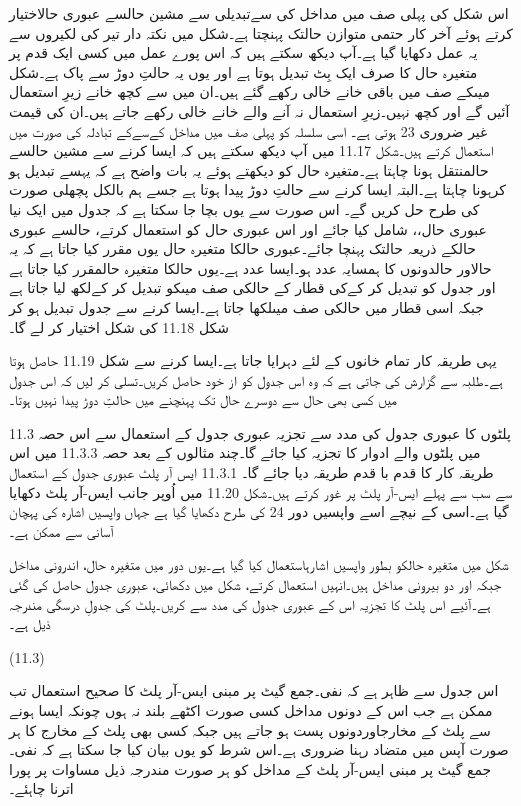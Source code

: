 	اس شکل کی پہلی صف میں مداخل کی سےتبدیلی سے مشین حالسے عبوری حالاختیار کرتے ہوئے آخر کار حتمی متوازن حالتک پہنچتا ہے۔شکل میں نکتہ دار تیر کی لکیروں سے یہ عمل دکھایا گیا ہے۔آپ دیکھ سکتے ہیں کہ اس پورے عمل میں کسی ایک قدم پر متغیرہ حال کا صرف ایک بِٹ تبدیل ہوتا ہے اور یوں یہ حالتِ دوڑ سے پاک ہے۔شکل میںکے صف میں باقی خانے خالی رکھے گئے ہیں۔ان میں سے کچھ خانے زیرِ استعمال آئیں گے اور کچھ نہیں۔زیرِ استعمال نہ آنے والے خانے خالی رکھے جاتے ہیں۔ان کی قیمت غیر ضروری 23 ہوتی ہے۔
	اسی سلسلہ کو پہلی صف میں مداخل کےسےکے تبادلہ کی صورت میں استعمال کرتے ہیں۔شکل 11.17 میں آپ دیکھ سکتے ہیں کہ ایسا کرنے سے مشین حالسے حالمنتقل ہونا چاہتا ہے۔متغیرہ حال کو دیکھتے ہوئے یہ بات واضح ہے کہ یہسے تبدیل ہو کرہونا چاہتا ہے۔البتہ ایسا کرنے سے حالتِ دوڑ پیدا ہوتا ہے جسے ہم بالکل پچھلی صورت کی طرح حل کریں گے۔
	اس صورت سے یوں بچا جا سکتا ہے کہ جدول میں ایک نیا عبوری حال،، شامل کیا جائے اور اس عبوری حال کو استعمال کرتے، حالسے عبوری حالکے ذریعہ حالتک پہنچا جائے۔عبوری حالکا متغیرہ حال یوں مقرر کیا جاتا ہے کہ یہ حالاور حالدونوں کا ہمسایہ عدد ہو۔ایسا عدد ہے۔یوں حالکا متغیرہ حالمقرر کیا جاتا ہے اور جدول کو تبدیل کر کےکی قطار کے حالکی صف میںکو تبدیل کر کےلکھ لیا جاتا ہے جبکہ اسی قطار میں حالکی صف میںلکھا جاتا ہے۔ایسا کرنے سے جدول تبدیل ہو کر شکل 11.18 کی شکل اختیار کر لے گا۔

	یہی طریقہ کار تمام خانوں کے لئے دہرایا جاتا ہے۔ایسا کرنے سے شکل 11.19 حاصل ہوتا ہے۔طلبہ سے گزارش کی جاتی ہے کہ وہ اس جدول کو از خود حاصل کریں۔تسلی کر لیں کہ اس جدول میں کسی بھی حال سے دوسرے حال تک پہنچنے میں حالتِ دوڑ پیدا نہیں ہوتا۔


11.3 پلٹوں کا عبوری جدول کی مدد سے تجزیہ
	عبوری جدول کے استعمال سے اس حصہ میں پلٹوں والے ادوار کا تجزیہ کیا جائے گا۔چند مثالوں کے بعد حصہ 11.3.3 میں اس طریقہ کار کا قدم با قدم طریقہ دیا جائے گا۔
11.3.1 ایس آر پلٹ
	عبوری جدول کے استعمال سے  سب سے پہلے ایس-آر پلٹ پر غور کرتے ہیں۔شکل 11.20 میں اُوپر جانب ایس-آر پلٹ دکھایا گیا ہے۔اسی کے نیچے اسے واپسیں دور 24 کی طرح دکھایا گیا ہے جہاں واپسیں اشارہ کی پہچان آسانی سے ممکن ہے۔


	شکل میں متغیرہ حالکو بطور واپسیں اشارہاستعمال کیا گیا ہے۔یوں دور میں متغیرہ حال، اندرونی مداخل جبکہ اور  دو بیرونی مداخل ہیں۔انہیں استعمال کرتے، شکل میں دکھائی، عبوری جدول حاصل کی گئی ہے۔آئیے اس پلٹ کا تجزیہ اس کے عبوری جدول کی مدد سے کریں۔پلٹ کی جدولِ درسگی مندرجہ ذیل ہے۔

 
(11.3)

	اس جدول سے ظاہر ہے کہ نفی۔جمع گیٹ پر مبنی ایس-آر پلٹ کا صحیح استعمال تب ممکن ہے جب اس کے دونوں مداخل کسی صورت اکٹھے بلند نہ ہوں چونکہ ایسا ہونے سے پلٹ کے مخارجاوردونوں پست ہو جاتے ہیں جبکہ کسی بھی پلٹ کے مخارج کا ہر صورت آپس میں متضاد رہنا ضروری ہے۔اس شرط کو یوں بیان کیا جا سکتا ہے کہ نفی۔جمع گیٹ پر مبنی ایس-آر پلٹ کے مداخل کو ہر صورت مندرجہ ذیل مساوات پر پورا اترنا چاہئے۔

